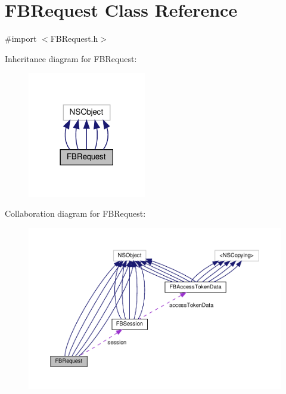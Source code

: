 \hypertarget{interfaceFBRequest}{}\section{F\+B\+Request Class Reference}
\label{interfaceFBRequest}


{\ttfamily \#import $<$F\+B\+Request.\+h$>$}



Inheritance diagram for F\+B\+Request\+:
\nopagebreak
\begin{figure}[H]
\begin{center}
\leavevmode
\includegraphics[width=146pt]{interfaceFBRequest__inherit__graph}
\end{center}
\end{figure}


Collaboration diagram for F\+B\+Request\+:
\nopagebreak
\begin{figure}[H]
\begin{center}
\leavevmode
\includegraphics[width=350pt]{interfaceFBRequest__coll__graph}
\end{center}
\end{figure}
